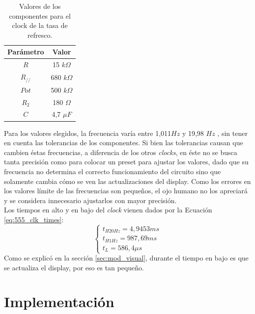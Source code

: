 \documentclass[11pt, a4paper]{article}
\begin{document}
\begin{table}[H]
\centering
\begin{tabular}{|c|c|}
\hline
\textbf{Par\'ametro}                 & \textbf{Valor} \\ \hline
$R$                                  & 15 $ k \Omega $            \\ \hline
$R_{//}$                             & 680 $ k \Omega $           \\ \hline
$Pot$                                & 500 $ k \Omega $           \\ \hline
$R_2$                                & 180 $ \Omega $            \\ \hline
$C$                                  & 4,7 $ \mu F$          \\ \hline
\end{tabular}
\caption{Valores de los componentes para el clock de la tasa de refresco.}
\label{clk3_valores}
\end{table}
%
Para los valores elegidos, la frecuencia var\'ia entre 1,011$Hz$ y 19,98
$Hz$
, sin tener en cuenta las tolerancias de los componentes. Si bien las tolerancias causan que cambien \'estas frecuencias, a diferencia de los otros \textit{clocks}, en \'este no se busca tanta precisi\'on como para colocar un preset para ajustar los valores, dado que su frecuencia no determina el correcto funcionamiento del circuito sino que solamente cambia c\'omo se ven las actualizaciones del display. Como los errores en los valores l\'imite de las frecuencias son pequeños, el ojo humano no los apreciar\'a y se considera innecesario ajustarlos con mayor precisi\'on. \\
Los tiempos en alto y en bajo del \textit{clock} vienen dados por la Ecuaci\'on \ref{eq:555_clk_times}:
\begin{equation}
    \begin{cases}
    t_{H20Hz} = 4,9453ms\\
    t_{H1Hz} = 987,69 ms\\
    t_L = 586,4 \mu s
    \end{cases}
\end{equation}
Como se explic\'o en la secci\'on \ref{sec:mod_visual}, durante el tiempo en bajo es que se actualiza el display, por eso es tan pequeño.
\newpage
\section{Implementaci\'on}
\end{document}
